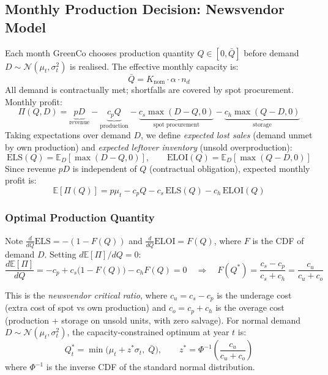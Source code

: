 \documentclass[10pt,a4paper]{article}
\newcommand{\E}{\mathbb{E}}
\begin{document}
\subsection{Monthly Production Decision: Newsvendor Model}
\label{sec:newsvendor}

Each month GreenCo chooses production quantity $Q \in [0,\bar{Q}]$ before demand $D \sim \mathcal{N}(\mu_t,\sigma_t^2)$ is realised. The effective monthly capacity is:
\begin{equation}
    \bar{Q} = K_{\mathrm{nom}} \cdot \alpha \cdot n_d
    \label{eq:capacity}
\end{equation}
All demand is contractually met; shortfalls are covered by spot procurement. Monthly profit:
\begin{equation}
    \Pi(Q,D) = \underbrace{pD}_{\text{revenue}} - \underbrace{c_p Q}_{\text{production}} - \underbrace{c_s\max(D-Q,0)}_{\text{spot procurement}} - \underbrace{c_h\max(Q-D,0)}_{\text{storage}}
    \label{eq:profit}
\end{equation}
Taking expectations over demand $D$, we define \textit{expected lost sales} (demand unmet by own production) and \textit{expected leftover inventory} (unsold overproduction):
\begin{equation}
    \text{ELS}(Q) = \E_D[\max(D-Q,0)], \qquad \text{ELOI}(Q) = \E_D[\max(Q-D,0)]
\end{equation}
Since revenue $pD$ is independent of $Q$ (contractual obligation), expected monthly profit is:
\begin{equation}
    \E[\Pi(Q)] = p\mu_t - c_p Q - c_s\,\text{ELS}(Q) - c_h\,\text{ELOI}(Q)
    \label{eq:exp_profit}
\end{equation}

\subsubsection{Optimal Production Quantity}

Note $\frac{d}{dQ}\text{ELS} = -(1-F(Q))$ and $\frac{d}{dQ}\text{ELOI} = F(Q)$, where $F$ is the CDF of demand $D$. Setting $d\E[\Pi]/dQ = 0$:
\begin{equation}
    \frac{d\E[\Pi]}{dQ} = -c_p + c_s\bigl(1-F(Q)\bigr) - c_h F(Q) = 0 \quad\Longrightarrow\quad \boxed{F(Q^*) = \frac{c_s - c_p}{c_s + c_h} = \frac{c_u}{c_u+c_o}}
    \label{eq:critical_ratio}
\end{equation}

This is the \textit{newsvendor critical ratio}, where $c_u = c_s - c_p$ is the underage cost (extra cost of spot vs own production) and $c_o = c_p + c_h$ is the overage cost (production + storage on unsold units, with zero salvage). For normal demand $D \sim \mathcal{N}(\mu_t, \sigma_t^2)$, the capacity-constrained optimum at year $t$ is:
\begin{equation}
    Q_t^* = \min\bigl(\mu_t + z^*\sigma_t,\;\bar{Q}\bigr), \qquad z^* = \Phi^{-1}\!\left(\frac{c_u}{c_u+c_o}\right)
    \label{eq:Q_star}
\end{equation}
where $\Phi^{-1}$ is the inverse CDF of the standard normal distribution.
\end{document}
